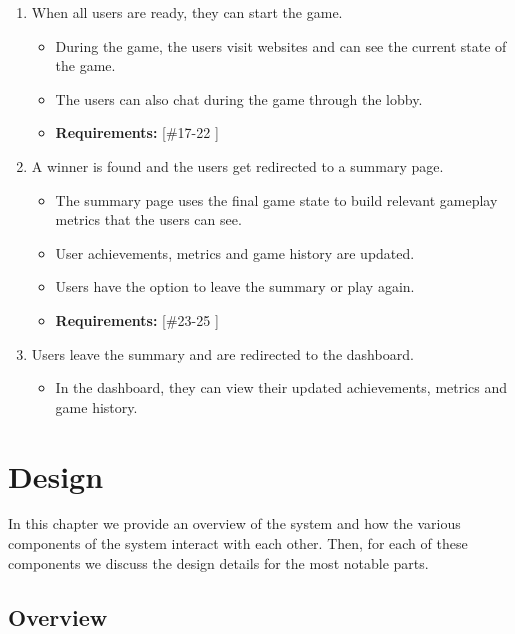 \documentclass{l4proj}
\begin{document}
\begin{enumerate}
\begin{itemize}
    \end{itemize}
    \item When all users are ready, they can start the game.
    \begin{itemize}
 	\item During the game, the users visit websites and can see the current state of the game.
           \item The users can also chat during the game through the lobby.
 	\item \textbf{Requirements: } [\#17-22 ]
    \end{itemize}
    \item A winner is found and the users get redirected to a summary page.
    \begin{itemize}
 	\item The summary page uses the final game state to build relevant gameplay metrics that the users can see.  
           \item User achievements, metrics and game history are updated.
           \item Users have the option to leave the summary or play again.
 	\item \textbf{Requirements: } [\#23-25 ]
    \end{itemize}
    \item Users leave the summary and are redirected to the dashboard.
    \begin{itemize}
        \item In the dashboard, they can view their updated achievements, metrics and game history.
    \end{itemize}

\end{enumerate}


\chapter{Design}
In this chapter we provide an overview of the system and how the various components of the system interact with each other. Then, for each of these components we discuss the design details for the most notable parts.

\section{Overview}
\end{document}
